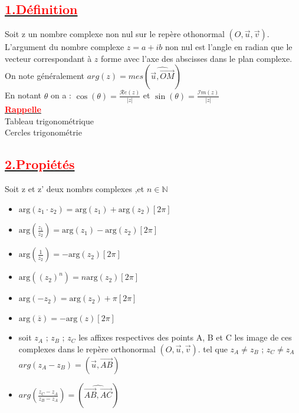 \documentclass[12pt,a4paper]{article}
\begin{document}
\subsection*{\underline{\textbf{\textcolor{red}{1.Définition}}}}
Soit z un nombre complexe non nul sur le repère othonormal $(O,\vec{u},\vec{v})$. L'argument du nombre complexe $z = a + ib$ non nul est l'angle en radian que le vecteur correspondant à $z$ forme avec l'axe des abscisses dans le plan complexe.\\ On note généralement $arg(z)=mes(\widehat{\vec{u},\vec{OM}})$\\
En notant $\theta$ on a : $\cos(\theta)=\frac{\mathcal{R}e(z)}{|z|}$ et 
$\sin(\theta)=\frac{\mathcal{I}m(z)}{|z|}$\\
\underline{\textbf{\textcolor{red}{Rappelle}}}\\
Tableau trigonométrique\\
Cercles trigonométrie\\
\subsection*{\underline{\textbf{\textcolor{red}{2.Propiétés}}}}
Soit z et z' deux nombrs complexes ,et $n\in \mathbb{N}$\\
\begin{itemize}
\item[$\bullet$] $\text{{arg}}(z_1 \cdot z_2) = \text{{arg}}(z_1) + \text{{arg}}(z_2)[2\pi]$\\
\item[$\bullet$] $\text{{arg}}(\frac{z_1}{z_2}) = \text{{arg}}(z_1) - \text{{arg}}(z_2)[2\pi]$\\
\item[$\bullet$] $\text{{arg}}(\frac{1}{z_2}) = - \text{{arg}}(z_2)[2\pi]$\\
\item[$\bullet$] $\text{{arg}}((z_2)^{n}) = n\text{{arg}}(z_2)[2\pi]$\\
\item[$\bullet$] $\text{{arg}}(-z_2) = \text{{arg}}(z_2)+\pi[2\pi]$\\
\item[$\bullet$] $\text{{arg}}(\overline{z}) = -\text{{arg}}(z)[2\pi]$\\
\item[$\bullet$] soit $z_A$ ; $z_B$ ; $z_C$ les affixes respectives des points A, B et C les image de ces complexes dans le repère orthonormal $(O,\vec{u},\vec{v})$. tel que $z_A \neq z_B$ ; 
$z_C \neq z_A$ $arg(z_A-z_B)=(\vec{u},\overrightarrow{AB})$
\item[$\bullet$] $arg(\frac{z_C-z_A}{z_B-z_A})=(\widehat{\overrightarrow{AB},\overrightarrow{AC}})$
\end{itemize}
\end{document}
